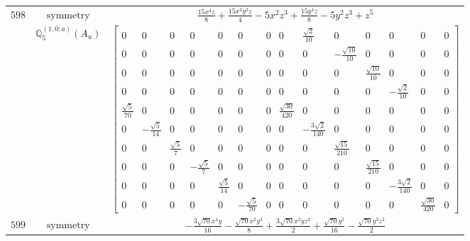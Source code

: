 \documentclass[fleqn,8pt,landscape]{jsarticle}
\begin{document}
\begin{longtable}{ccc}
$ 598 $ & $ \text{symmetry} $ & $ \frac{15 x^{4} z}{8} + \frac{15 x^{2} y^{2} z}{4} - 5 x^{2} z^{3} + \frac{15 y^{4} z}{8} - 5 y^{2} z^{3} + z^{5} $ \\
$  $ & $ \mathbb{Q}_{5}^{(1,0;a)}(A_{u}) $ & $ \begin{bmatrix} 0 & 0 & 0 & 0 & 0 & 0 & 0 & 0 & \frac{\sqrt{2}}{10} & 0 & 0 & 0 & 0 & 0 \\ 0 & 0 & 0 & 0 & 0 & 0 & 0 & 0 & 0 & - \frac{\sqrt{10}}{10} & 0 & 0 & 0 & 0 \\ 0 & 0 & 0 & 0 & 0 & 0 & 0 & 0 & 0 & 0 & \frac{\sqrt{10}}{10} & 0 & 0 & 0 \\ 0 & 0 & 0 & 0 & 0 & 0 & 0 & 0 & 0 & 0 & 0 & - \frac{\sqrt{2}}{10} & 0 & 0 \\ \frac{\sqrt{5}}{70} & 0 & 0 & 0 & 0 & 0 & 0 & \frac{\sqrt{30}}{420} & 0 & 0 & 0 & 0 & 0 & 0 \\ 0 & - \frac{\sqrt{5}}{14} & 0 & 0 & 0 & 0 & 0 & 0 & - \frac{3 \sqrt{2}}{140} & 0 & 0 & 0 & 0 & 0 \\ 0 & 0 & \frac{\sqrt{5}}{7} & 0 & 0 & 0 & 0 & 0 & 0 & \frac{\sqrt{15}}{210} & 0 & 0 & 0 & 0 \\ 0 & 0 & 0 & - \frac{\sqrt{5}}{7} & 0 & 0 & 0 & 0 & 0 & 0 & \frac{\sqrt{15}}{210} & 0 & 0 & 0 \\ 0 & 0 & 0 & 0 & \frac{\sqrt{5}}{14} & 0 & 0 & 0 & 0 & 0 & 0 & - \frac{3 \sqrt{2}}{140} & 0 & 0 \\ 0 & 0 & 0 & 0 & 0 & - \frac{\sqrt{5}}{70} & 0 & 0 & 0 & 0 & 0 & 0 & \frac{\sqrt{30}}{420} & 0 \end{bmatrix} $ \\ \hline
$ 599 $ & $ \text{symmetry} $ & $ - \frac{3 \sqrt{70} x^{4} y}{16} - \frac{\sqrt{70} x^{2} y^{3}}{8} + \frac{3 \sqrt{70} x^{2} y z^{2}}{2} + \frac{\sqrt{70} y^{5}}{16} - \frac{\sqrt{70} y^{3} z^{2}}{2} $ \\

\end{longtable}
\end{document}
